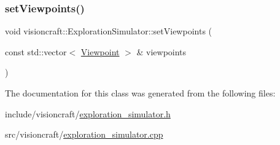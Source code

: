 \mbox{\label{classvisioncraft_1_1ExplorationSimulator_a9ea722d4f4f841df0daf6b3dd65229f2}} 
\subsubsection{\texorpdfstring{set\+Viewpoints()}{setViewpoints()}}
{\footnotesize\ttfamily void visioncraft\+::\+Exploration\+Simulator\+::set\+Viewpoints (\begin{DoxyParamCaption}\item[{const std\+::vector$<$ \hyperlink{classvisioncraft_1_1Viewpoint}{Viewpoint} $>$ \&}]{viewpoints }\end{DoxyParamCaption})}



The documentation for this class was generated from the following files\+:\begin{DoxyCompactItemize}
\item 
include/visioncraft/\hyperlink{exploration__simulator_8h}{exploration\+\_\+simulator.\+h}\item 
src/visioncraft/\hyperlink{exploration__simulator_8cpp}{exploration\+\_\+simulator.\+cpp}\end{DoxyCompactItemize}
